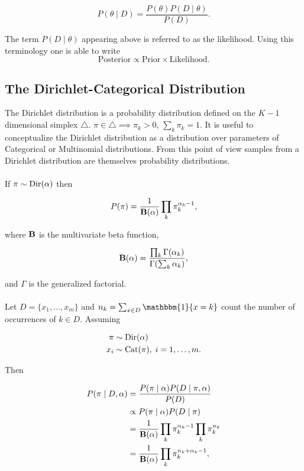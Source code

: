 \documentclass[12pt]{report}
\newcommand{\1}[0]{\mathbbm{1}}
\newcommand{\Cat}[0]{\textnormal{Cat}}
\newcommand{\Dir}[0]{\textnormal{Dir}}
\newcommand{\Bf}[0]{\text{\textbf{B}}}
\begin{document}
\[
    P(\theta \mid D) = \frac{P(\theta)P(D \mid \theta)}{P(D)}.
\]

The term $P(D \mid \theta)$ appearing above is referred to as the likelihood.
Using this terminology one is able to write
\[
    \text{Posterior} \propto \text{Prior} \times \text{Likelihood}.
\]

\subsection{The Dirichlet-Categorical Distribution}
The Dirichlet distribution is a probability distribution defined on the $K-1$ 
dimensional simplex $\triangle$. $\pi \in \triangle \implies \pi_k > 0$, $\sum_k \pi_k = 1$.
It is useful to conceptualize the Dirichlet distribution as a distribution over
parameters of Categorical or Multinomial distributions. From this point of view 
samples from a Dirichlet distribution are themselves probability distributions.
\\\\
If $\pi \sim \Dir(\alpha)$ then

\begin{equation}
    P(\pi) = \frac{1}{\Bf(\alpha)} \prod_k \pi_k^{\alpha_k-1}, \label{eq:dir-pdf}
\end{equation}

where $\Bf$ is the multivariate beta function,

\begin{equation}
    \Bf(\alpha) = \frac{\prod_k \Gamma(\alpha_k)}{\Gamma(\sum_k \alpha_k)}, \label{eq:betafunc}
\end{equation}

and $\Gamma$ is the generalized factorial.
\\\\
Let $D = \{x_1, \ldots, x_m\}$ and $n_k = \sum_{x \in D} \1\{x = k\}$ count 
the number of occurrences of $k \in D$. Assuming

\begin{align*}
    \pi & \sim \Dir(\alpha) \\
    x_i & \sim \Cat(\pi),\; i = 1, \ldots, m.
\end{align*}

Then

\begin{align*}
    P(\pi \mid D, \alpha) 
    &= \frac{P(\pi \mid \alpha) P(D \mid \pi, \alpha)}{P(D)} \\
    & \propto P(\pi \mid \alpha) P(D \mid \pi) \\
    &= \frac{1}{\Bf(\alpha)} \prod_k \pi_k^{\alpha_k - 1} \prod_k \pi_k^{n_k} \\
    &= \frac{1}{\Bf(\alpha)} \prod_k \pi_k^{n_k + \alpha_k - 1},
\end{align*}
\end{document}
